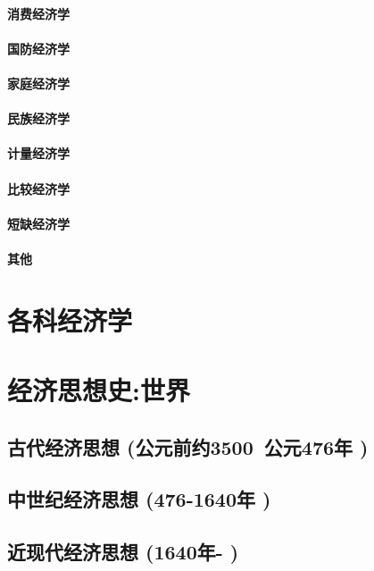 \documentclass[UTF8]{../../RepresentationUniverse}
\begin{document}
    \subsubsection{消费经济学}
    \subsubsection{国防经济学}
    \subsubsection{家庭经济学}
    \subsubsection{民族经济学}
    \subsubsection{计量经济学}
    \subsubsection{比较经济学}
    \subsubsection{短缺经济学}
    \subsubsection{其他}


\chapter{各科经济学}


\chapter{经济思想史:世界}

\section{古代经济思想 (公元前约3500~公元476年 )}
\section{中世纪经济思想 (476-1640年 )}
\section{近现代经济思想 (1640年- )}
\end{document}
